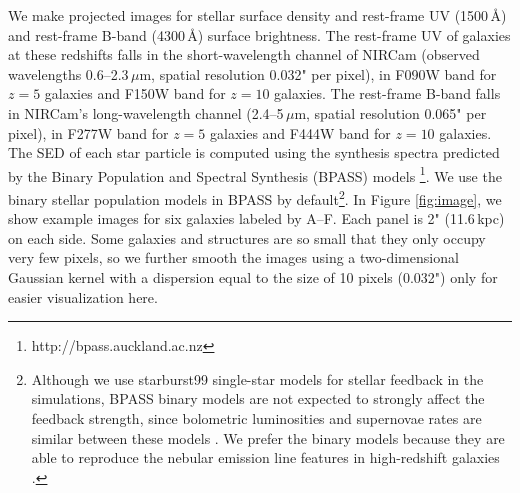 \documentclass[useAMS,usenatbib]{mn2e}
\newcommand{\referee}[1]{{\color{black}#1}}
\begin{document}
We make projected images for stellar surface density and rest-frame UV (1500\,\AA) and rest-frame B-band (4300\,\AA) surface brightness. The rest-frame UV of galaxies at these redshifts falls in the short-wavelength channel of NIRCam (observed wavelengths 0.6--2.3\,$\mu$m, spatial resolution 0.032" per pixel), in F090W band for $z=5$ galaxies and F150W band for $z=10$ galaxies. The rest-frame B-band falls in NIRCam's long-wavelength channel (2.4--5\,$\mu$m, spatial resolution 0.065" per pixel), in F277W band for $z=5$ galaxies and F444W band for $z=10$ galaxies. The SED of each star particle is computed using the synthesis spectra predicted by the Binary Population and Spectral Synthesis (BPASS) models \citep[version 2.0;][]{eldridge.2008:bpass.model}\footnote{http://bpass.auckland.ac.nz}. We use the binary stellar population models in BPASS by default\footnote{\referee{Although we use {\sc starburst99} single-star models for stellar feedback in the simulations, BPASS binary models are not expected to strongly affect the feedback strength, since bolometric luminosities and supernovae rates are similar between these models \citep[see section 2.2 in][for more discussion]{ma.2017:fire.hiz.smf}. We prefer the binary models because they are able to reproduce the nebular emission line features in high-redshift galaxies \citep[e.g.][]{steidel.2016:stellar.nebular.spec,strom.2017:nebular.line.mosfire}.}}. In Figure \ref{fig:image}, we show example images for six galaxies labeled by A--F. Each panel is 2" (11.6\,kpc) on each side. Some galaxies and structures are so small that they only occupy very few pixels, so we further smooth the images using a two-dimensional Gaussian kernel with a dispersion equal to the size of 10 pixels (0.032") only for easier visualization here.
\end{document}
